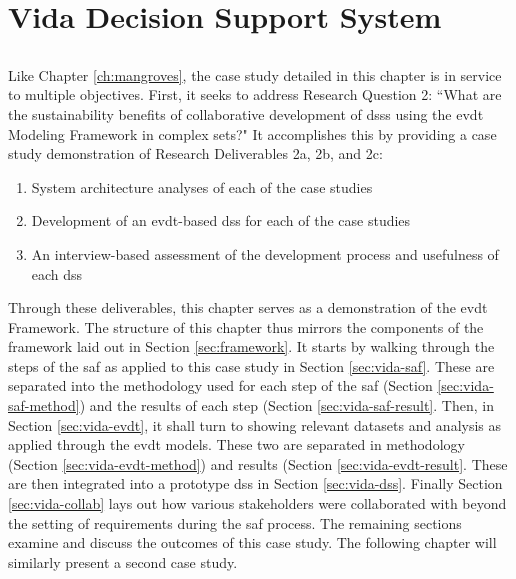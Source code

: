 \chapter{Vida Decision Support System} \label{ch:vida}


\section{}

Like Chapter \ref{ch:mangroves}, the case study detailed in this chapter is in service to multiple objectives. First, it seeks to address Research Question 2: ``What are the sustainability benefits of collaborative development of \acp{dss} using the \acf{evdt} Modeling Framework in complex \acf{sets}?" It accomplishes this by providing a case study demonstration of Research Deliverables 2a, 2b, and 2c: 

	\begin{enumerate}[label=\emph{\alph*},itemsep=0pt,parsep=0pt]
		\item{System architecture analyses of each of the case studies} 
		\item{Development of an \ac{evdt}-based \acf{dss} for each of the case studies} 
		\item{An interview-based assessment of the development process and usefulness of each \ac{dss}} 
	\end{enumerate}
	
Through these deliverables, this chapter serves as a demonstration of the \ac{evdt} Framework. The structure of this chapter thus mirrors the components of the framework laid out in Section \ref{sec:framework}. It starts by walking through the steps of the \acf{saf} as applied to this case study in Section \ref{sec:vida-saf}. These are separated into the methodology used for each step of the \ac{saf} (Section \ref{sec:vida-saf-method}) and the results of each step (Section \ref{sec:vida-saf-result}. Then, in Section \ref{sec:vida-evdt}, it shall turn to showing relevant datasets and analysis as applied through the \acf{evdt} models. These two are separated in methodology (Section \ref{sec:vida-evdt-method}) and results (Section \ref{sec:vida-evdt-result}. These are then integrated into a prototype \ac{dss} in Section \ref{sec:vida-dss}. Finally Section \ref{sec:vida-collab} lays out how various stakeholders were collaborated with beyond the setting of requirements during the \ac{saf} process. The remaining sections examine and discuss the outcomes of this case study. The following chapter will similarly present a second case study.  

